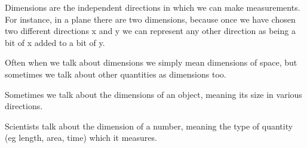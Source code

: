 Dimensions are the independent directions in which we can make
measurements. For instance, in a plane there are two dimensions, 
because once we have chosen two different directions x and y 
we can represent any other direction as being a bit of x added 
to a bit of y.
\par
Often when we talk about dimensions we simply mean dimensions of
space, but sometimes we talk about other quantities as dimensions
too.
\par
Sometimes we talk about the dimensions of an object, meaning its
size in various directions.

\par
Scientists talk about the dimension of a number,
meaning the type of quantity (eg length, area, time) which
it measures.